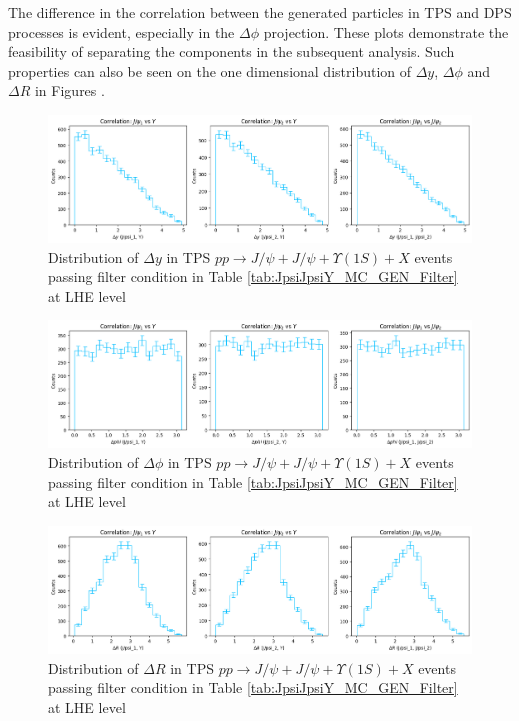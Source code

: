\documentclass[10pt,twocolumn]{article}
\begin{document}
The difference in the correlation between the generated particles in TPS and DPS processes is evident, especially in the $\Delta \phi$ projection. These plots demonstrate the feasibility of separating the components in the subsequent analysis. Such properties can also be seen on the one dimensional distribution of $\Delta y$, $\Delta \phi$ and $\Delta R$ in Figures .

\begin{figure}[!htbp]
    \centering
    \includegraphics[width=1.0\linewidth]{images/LHE_LEVEL_TPS_DeltaY_filtered.png}
    \caption{Distribution of $\Delta y$ in TPS $pp\to J/\psi+J/\psi+\Upsilon(1S)+X$ events passing filter condition in Table \ref{tab:JpsiJpsiY_MC_GEN_Filter} at LHE level}
    \label{fig:TPS_JJY1S_filtered_DeltaY_LHE}
\end{figure}

\begin{figure}[!htbp]
    \centering
    \includegraphics[width=1.0\linewidth]{images/LHE_LEVEL_TPS_DeltaPhi_filtered.png}
    \caption{Distribution of $\Delta \phi$ in TPS $pp\to J/\psi+J/\psi+\Upsilon(1S)+X$ events passing filter condition in Table \ref{tab:JpsiJpsiY_MC_GEN_Filter} at LHE level}
    \label{fig:TPS_JJY1S_filtered_DeltaPhi_LHE}
\end{figure}

\begin{figure}[!htbp]
    \centering
    \includegraphics[width=1.0\linewidth]{images/LHE_LEVEL_TPS_DeltaR_filtered.png}
    \caption{Distribution of $\Delta R$ in TPS $pp\to J/\psi+J/\psi+\Upsilon(1S)+X$ events passing filter condition in Table \ref{tab:JpsiJpsiY_MC_GEN_Filter} at LHE level}
    \label{fig:TPS_JJY1S_filtered_DeltaR_LHE}
\end{figure}
\end{document}
